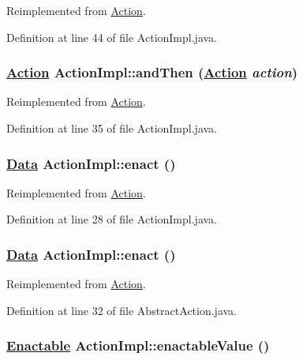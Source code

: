 Reimplemented from \hyperlink{interfaceAction_a6}{Action}.

Definition at line 44 of file Action\-Impl.java.\hypertarget{classActionImpl_a13}{
\subsubsection[andThen]{\setlength{\rightskip}{0pt plus 5cm}\hyperlink{interfaceAction}{Action} Action\-Impl::and\-Then (\hyperlink{interfaceAction}{Action} {\em action})}}
\label{classActionImpl_a13}




Reimplemented from \hyperlink{interfaceAction_a3}{Action}.

Definition at line 35 of file Action\-Impl.java.\hypertarget{classActionImpl_a11}{
\subsubsection[enact]{\setlength{\rightskip}{0pt plus 5cm}\hyperlink{interfaceData}{Data} Action\-Impl::enact ()}}
\label{classActionImpl_a11}




Reimplemented from \hyperlink{interfaceAction_a1}{Action}.

Definition at line 28 of file Action\-Impl.java.\hypertarget{classActionImpl_a1}{
\subsubsection[enact]{\setlength{\rightskip}{0pt plus 5cm}\hyperlink{interfaceData}{Data} Action\-Impl::enact ()}}
\label{classActionImpl_a1}




Reimplemented from \hyperlink{interfaceAction_a1}{Action}.

Definition at line 32 of file Abstract\-Action.java.\hypertarget{classActionImpl_a10}{
\subsubsection[enactableValue]{\setlength{\rightskip}{0pt plus 5cm}\hyperlink{interfaceEnactable}{Enactable} Action\-Impl::enactable\-Value ()}}
\label{classActionImpl_a10}




